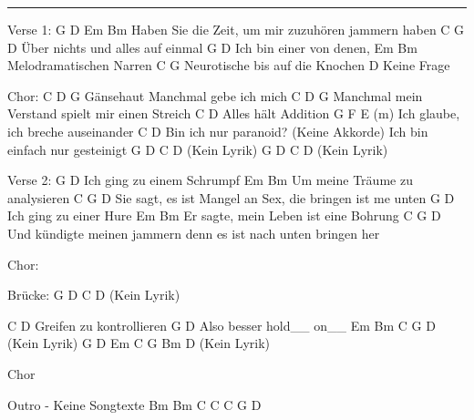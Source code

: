 \noindent\rule{\columnwidth}{1pt}

\begin{multicols}{2}
\begin{lstsong}
Verse 1:
G D Em Bm
Haben Sie die Zeit, um mir zuzuhören 
   jammern haben
C G D
Über nichts und alles auf einmal
G D
Ich bin einer von denen,
Em Bm
Melodramatischen Narren
C G
Neurotische bis auf die Knochen
               D
Keine Frage

Chor:
C D G
Gänsehaut Manchmal gebe ich mich
C D G
Manchmal mein Verstand spielt mir einen Streich
 C D
Alles hält Addition
 G F E (m)
Ich glaube, ich breche auseinander
C D
Bin ich nur paranoid? 
(Keine Akkorde)
Ich bin einfach nur gesteinigt
G D C D
(Kein Lyrik)
G D C D
(Kein Lyrik)

Verse 2:
G D
Ich ging zu einem Schrumpf
  Em Bm
Um meine Träume zu analysieren
  C G D
Sie sagt, es ist Mangel an Sex, die bringen ist me unten
G D
Ich ging zu einer Hure
 Em Bm
Er sagte, mein Leben ist eine Bohrung
  C G D 
Und kündigte meinen jammern denn es ist nach unten bringen her

Chor:

Brücke:
G D C D
(Kein Lyrik)

C D
Greifen zu kontrollieren
               G D
Also besser hold__ on__
Em Bm C G D
(Kein Lyrik)
G D Em C G Bm D
(Kein Lyrik)

Chor

Outro - Keine Songtexte
Bm Bm C C
C G D
\end{lstsong}
\end{multicols}
\newpage

